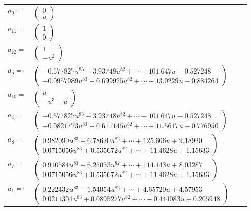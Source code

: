 \documentclass[1p]{elsarticle_modified}
\theoremstyle{definition}
\begin{document}
\begin{tabular}{m{7pt} m{180pt} m{7pt} m{180pt} }
\flushright $a_{9}=$&$\begin{pmatrix}0\\u\end{pmatrix}$ \\
\flushright $a_{11}=$&$\begin{pmatrix}1\\0\end{pmatrix}$ \\
\flushright $a_{12}=$&$\begin{pmatrix}1\\- u^2\end{pmatrix}$ \\
\flushright $a_{5}=$&$\begin{pmatrix}-0.577827 u^{83}-3.93748 u^{82}+\cdots-101.647 u-0.527248\\-0.0957989 u^{83}-0.699925 u^{82}+\cdots-13.0229 u-0.884264\end{pmatrix}$ \\
\flushright $a_{10}=$&$\begin{pmatrix}u\\- u^3+u\end{pmatrix}$ \\
\flushright $a_{4}=$&$\begin{pmatrix}-0.577827 u^{83}-3.93748 u^{82}+\cdots-101.647 u-0.527248\\-0.0821773 u^{83}-0.611145 u^{82}+\cdots-11.5617 u-0.776950\end{pmatrix}$ \\
\flushright $a_{8}=$&$\begin{pmatrix}0.982090 u^{83}+6.78620 u^{82}+\cdots+125.606 u+9.18920\\0.0715056 u^{83}+0.535672 u^{82}+\cdots+11.4628 u+1.15633\end{pmatrix}$ \\
\flushright $a_{7}=$&$\begin{pmatrix}0.910584 u^{83}+6.25053 u^{82}+\cdots+114.143 u+8.03287\\0.0715056 u^{83}+0.535672 u^{82}+\cdots+11.4628 u+1.15633\end{pmatrix}$ \\
\flushright $a_{1}=$&$\begin{pmatrix}0.222432 u^{83}+1.54054 u^{82}+\cdots+4.65720 u+4.57953\\0.0211304 u^{83}+0.0895277 u^{82}+\cdots-0.444083 u+0.205948\end{pmatrix}$ \\

\end{tabular}
\end{document}

